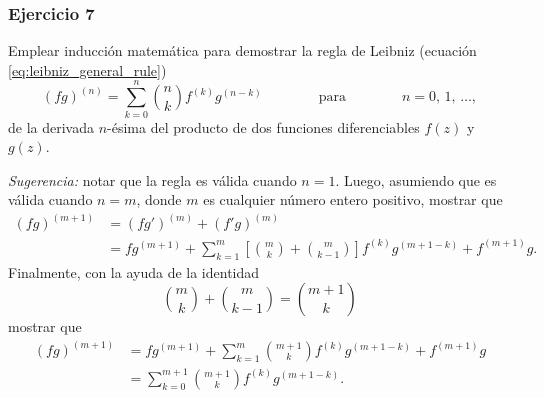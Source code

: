 \documentclass[a4paper]{report}
\begin{document}
\subsubsection*{Ejercicio 7}

Emplear inducción matemática para demostrar la regla de Leibniz (ecuación \ref{eq:leibniz_general_rule}) 
\[
 (fg)^{(n)}=\sum_{k=0}^n\binom{n}{k}f^{(k)}g^{(n-k)}
 \qquad\qquad\textrm{para}\qquad\qquad
 n=0,\,1,\,\dots, 
\]
de la derivada \(n\)-ésima del producto de dos funciones diferenciables \(f(z)\) y \(g(z)\).

\emph{Sugerencia:} notar que la regla es válida cuando \(n=1\). Luego, asumiendo que es válida cuando \(n=m\), donde \(m\) es cualquier número entero positivo, mostrar que 
\begin{align*}
 (fg)^{(m+1)}&=(fg')^{(m)}+(f'g)^{(m)}\\
  &=fg^{(m+1)}+\sum_{k=1}^m\left[\binom{m}{k}+\binom{m}{k-1}\right]f^{(k)}g^{(m+1-k)}+f^{(m+1)}g.
\end{align*}
Finalmente, con la ayuda de la identidad 
\begin{equation}\label{eq:combinations_sum_property}
 \binom{m}{k}+\binom{m}{k-1}=\binom{m+1}{k} 
\end{equation}
mostrar que 
\begin{align*}
 (fg)^{(m+1)}&=fg^{(m+1)}+\sum_{k=1}^m\binom{m+1}{k}f^{(k)}g^{(m+1-k)}+f^{(m+1)}g\\
  &=\sum_{k=0}^{m+1}\binom{m+1}{k}f^{(k)}g^{(m+1-k)}.
\end{align*}
\end{document}
